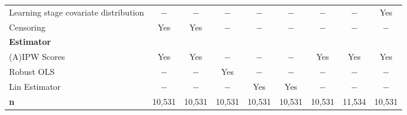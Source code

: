 \begin{tabular}[t]{lcccccccc}
\hspace{1em} Learning stage covariate distribution & $-$ & $-$ &  $-$ &  $-$ & $-$ &  $-$ &  $-$ &  Yes \\

\hspace{1em} Censoring &Yes &Yes &  $-$ &  $-$ &  $-$ &  $-$ &  $-$ &  $-$ 
\\

{\textbf{Estimator}} \rule{0pt}{1.2\normalbaselineskip}\\

\hspace{1em} (A)IPW Scores & Yes & Yes &  $-$ &  $-$ &  $-$ & Yes & Yes & Yes\\

\hspace{1em} Robust OLS &  $-$ &  $-$ & Yes &  $-$ &  $-$ &  $-$ & $-$ &  $-$ \\

\hspace{1em} Lin Estimator &  $-$ &  $-$ &  $-$ & Yes & Yes &  $-$ & $-$ &  $-$ \\

{\textbf{n}} & 10,531 & 10,531 & 10,531 & 10,531 & 10,531 & 10,531 &11,534  & 10,531 
\rule{0pt}{1.2\normalbaselineskip}\\

\end{tabular}
